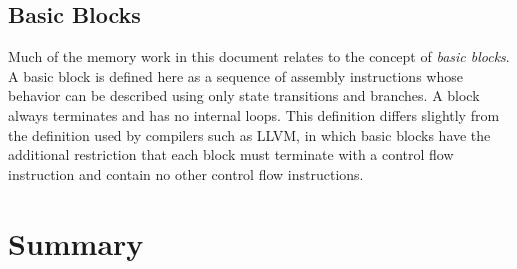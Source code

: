 \subsection{Basic Blocks}
Much of the memory work in this document relates to the concept of \emph{basic blocks}.%
A basic block is defined here as a sequence of assembly instructions
whose behavior can be described using only state transitions and branches.
A block always terminates and has no internal loops.
This definition differs slightly from the definition used by compilers such as LLVM,
in which basic blocks have the additional restriction that
each block must terminate with a control flow instruction and contain no other
control flow instructions.

\section{Summary}
